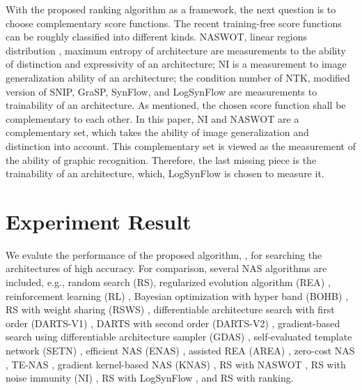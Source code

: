 \documentclass[sigconf]{acmart}
\begin{document}
    With the proposed ranking algorithm as a framework, the next question is 
    to choose complementary score functions. The recent training-free 
    score functions can be roughly classified into different kinds. NASWOT, 
    linear regions distribution \cite{https://doi.org/10.48550/arxiv.2102.11535} \cite{lin2021zennas}, 
    maximum entropy of architecture \cite{sun2022maedet} are measurements 
    to the ability of distinction and expressivity of an architecture; 
    NI is a measurement to image generalization ability of an architecture; 
    the condition number of NTK, modified version of SNIP, GraSP, SynFlow, and 
    LogSynFlow are measurements to trainability of an architecture. 
    As mentioned, the chosen score function shall be complementary to each other. 
    In this paper, NI and NASWOT are a complementary set, which takes 
    the ability of image generalization and distinction into account. 
    This complementary set is viewed as the measurement of the ability of graphic 
    recognition. Therefore, the last missing piece is the trainability of an 
    architecture, which, LogSynFlow is chosen to measure it. 

    \section{Experiment Result}
    \label{sec:results}

    We evalute the performance of the proposed algorithm, \palg{}, 
    for searching the architectures of high accuracy. For comparison, several NAS 
    algorithms are included, e.g., random search (RS), regularized evolution algorithm 
    (REA) \cite{real2019regularized}, reinforcement learning (RL) \cite{Williams:92}, 
    Bayesian optimization with hyper band (BOHB) \cite{falkner2018bohb}, RS with 
    weight sharing (RSWS) \cite{li2019random}, differentiable architecture search 
    with first order (DARTS-V1) \cite{liu2019darts}, DARTS with second order 
    (DARTS-V2) \cite{liu2019darts}, gradient-based search using differentiable 
    architecture sampler (GDAS) \cite{dong2019searching}, self-evaluated template 
    network (SETN) \cite{Dong_2019}, efficient NAS (ENAS) \cite{pham2018efficient}, 
    assisted REA (AREA) \cite{https://doi.org/10.48550/arxiv.2006.04647}, 
    zero-cost NAS \cite{https://doi.org/10.48550/arxiv.2101.08134}, 
    TE-NAS \cite{https://doi.org/10.48550/arxiv.2102.11535}, gradient kernel-based 
    NAS (KNAS) \cite{xu2021knas}, RS with NASWOT \cite{https://doi.org/10.48550/arxiv.2006.04647}, 
    RS with noise immunity (NI) \cite{10092788}, RS with LogSynFlow \cite{Cavagnero_2023}, 
    and RS with ranking.  
\end{document}
